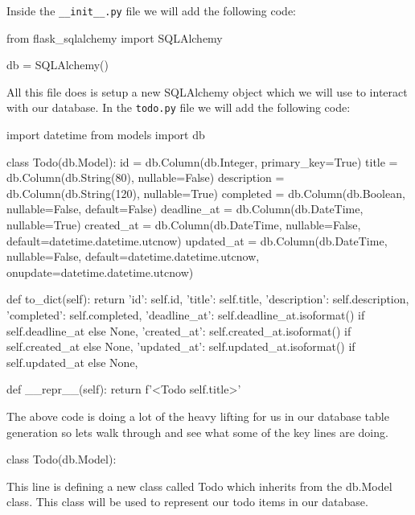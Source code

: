 \documentclass{csse4400}
\begin{document}
Inside the \texttt{\_\_init\_\_.py} file we will add the following code:

\begin{code}[language=python,numbers=none]{}
  from flask_sqlalchemy import SQLAlchemy

  db = SQLAlchemy()
\end{code}

All this file does is setup a new SQLAlchemy object which we will use to interact with our database. In the \texttt{todo.py} file we will add the following code:

\begin{code}[language=python,numbers=none]{}
  import datetime
  from models import db

  class Todo(db.Model):
      id = db.Column(db.Integer, primary_key=True)
      title = db.Column(db.String(80), nullable=False)
      description = db.Column(db.String(120), nullable=True)
      completed = db.Column(db.Boolean, nullable=False, default=False)
      deadline_at = db.Column(db.DateTime, nullable=True)
      created_at = db.Column(db.DateTime, nullable=False, default=datetime.datetime.utcnow)
      updated_at = db.Column(db.DateTime, nullable=False, default=datetime.datetime.utcnow, onupdate=datetime.datetime.utcnow)

      def to_dict(self):
          return {
              'id': self.id,
              'title': self.title,
              'description': self.description,
              'completed': self.completed,
              'deadline_at': self.deadline_at.isoformat() if self.deadline_at else None,
              'created_at': self.created_at.isoformat() if self.created_at else None,
              'updated_at': self.updated_at.isoformat() if self.updated_at else None,
          }

      def __repr__(self):
          return f'<Todo {self.title}>'
\end{code}

The above code is doing a lot of the heavy lifting for us in our database table generation so lets walk through and see what some of the key lines are doing.

\begin{code}[language=python,numbers=none]{}
  class Todo(db.Model):
\end{code}

This line is defining a new class called Todo which inherits from the db.Model class. This class will be used to represent our todo items in our database.
\end{document}

